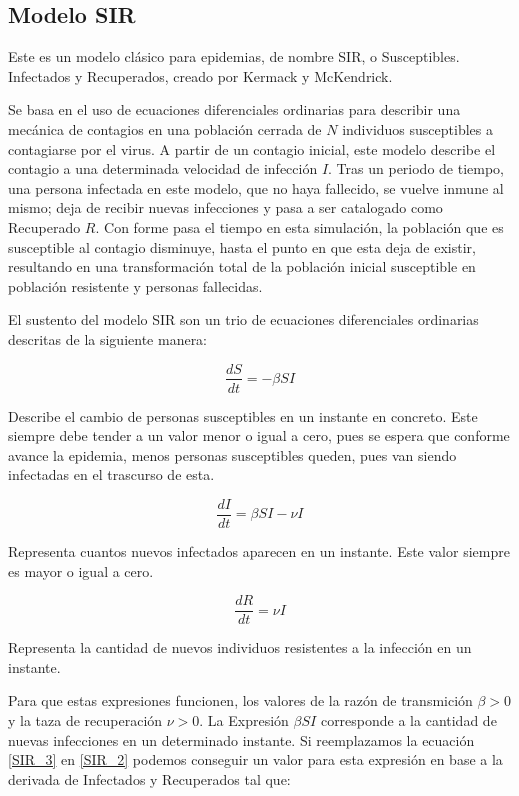 \subsection{Modelo SIR} 
Este es un modelo clásico para epidemias, de nombre SIR, o Susceptibles. Infectados y Recuperados, creado por Kermack y McKendrick. 

Se basa en el uso de ecuaciones diferenciales ordinarias para describir una mecánica de contagios en una población cerrada de $N$ individuos susceptibles a contagiarse por el virus. A partir de un contagio inicial, este modelo describe el contagio a una determinada velocidad de infección $I$. Tras un periodo de tiempo, una persona infectada en este modelo, que no haya fallecido, se vuelve inmune al mismo; deja de recibir nuevas infecciones y pasa a ser catalogado como Recuperado $R$. Con forme pasa el tiempo en esta simulación, la población que es susceptible al contagio disminuye, hasta el punto en que esta deja de existir, resultando en una transformación total de la población inicial susceptible en población resistente y personas fallecidas.

El sustento del modelo SIR son un trio de ecuaciones diferenciales ordinarias descritas de la siguiente manera:

\begin{equation} \frac{dS}{dt} = -\beta S I \label{SIR_1} \end{equation}

Describe el cambio de personas susceptibles en un instante en concreto. Este siempre debe tender a un valor menor o igual a cero, pues se espera que conforme avance la epidemia, menos personas susceptibles queden, pues van siendo infectadas en el trascurso de esta.

\begin{equation} \frac{dI}{dt} = \beta S I - \nu I \label{SIR_2} \end{equation}

Representa cuantos nuevos infectados aparecen en un instante. Este valor siempre es mayor o igual a cero.

\begin{equation} \frac{dR}{dt} = \nu I \label{SIR_3} \end{equation}

Representa la cantidad de nuevos individuos resistentes a la infección en un instante.

Para que estas expresiones funcionen, los valores de la razón de transmición $ \beta > 0 $ y la taza de recuperación $ \nu > 0 $.
La Expresión $ \beta S I $ corresponde a la cantidad de nuevas infecciones en un determinado instante. Si reemplazamos la ecuación \eqref{SIR_3} en \eqref{SIR_2} podemos conseguir un valor para esta expresión en base a la derivada de Infectados y Recuperados tal que:

